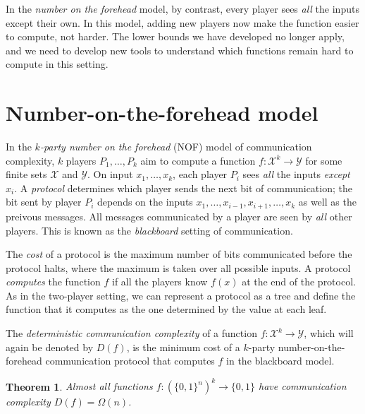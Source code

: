 \documentclass[11pt,oneside]{book}
\theoremstyle{plain}
\newtheorem{theorem}{Theorem}
\theoremstyle{definition}
\theoremstyle{plain}
\newcommand{\calX}{\mathcal{X}}
\newcommand{\calY}{\mathcal{Y}}
\begin{document}
	In the \emph{number on the forehead} model, by contrast, every player sees \emph{all} the inputs except their own. In this model, adding new players now make the function easier to compute, not harder. The lower bounds we have developed no longer apply, and we need to develop new tools to understand which functions remain hard to compute in this setting.
	
	\newpage
	 
	\section{Number-on-the-forehead model}
	
	In the \emph{$k$-party number on the forehead} (NOF) model of communication complexity, $k$ players $P_1,\ldots,P_k$ aim to compute a function $f : \calX^k \to \calY$ for some finite sets $\calX$ and $\calY$. On input $x_1,\ldots,x_k$, each player $P_i$ sees \emph{all} the inputs \emph{except} $x_i$. A \emph{protocol} determines which player sends the next bit of communication; the bit sent by player $P_i$ depends on the inputs $x_1,\ldots,x_{i-1},x_{i+1},\ldots,x_k$ as well as the preivous messages. All messages communicated by a player are seen by \emph{all} other players. This is known as the \emph{blackboard} setting of communication.
	
	The \emph{cost} of a protocol is the maximum number of bits communicated before the protocol halts, where the maximum is taken over all possible inputs. A protocol \emph{computes} the function $f$ if all the players know $f(x)$ at the end of the protocol. As in the two-player setting, we can represent a protocol as a tree and define the function that it computes as the one determined by the value at each leaf.
	
	The \emph{deterministic communication complexity} of a function $f : \calX^k \to \calY$, which will again be denoted by $D(f)$, is the minimum cost of a $k$-party number-on-the-forehead communication protocol that computes $f$ in the blackboard model.
	
	\begin{theorem}
		Almost all functions $f : (\{0,1\}^{n})^k \to \{0,1\}$ have communication complexity $D(f) = \Omega(n)$.
	\end{theorem}
	
\end{document}
